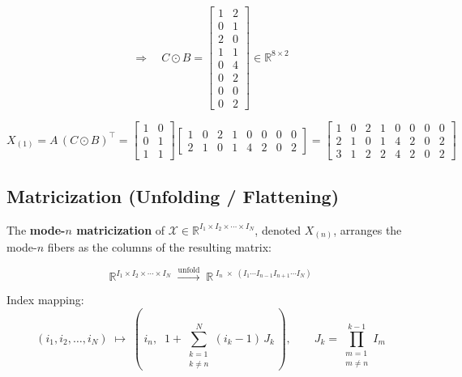 \documentclass[12pt]{article}
\newcommand{\T}[1]{\mathcal{#1}}   %
\begin{document}
\begin{equation}
\Rightarrow \quad
C \odot B =
\begin{bmatrix}
1 & 2 \\
0 & 1 \\
2 & 0 \\
1 & 1 \\
0 & 4 \\
0 & 2 \\
0 & 0 \\
0 & 2
\end{bmatrix}
\in \mathbb{R}^{8 \times 2}
\end{equation}

\begin{equation}
X_{(1)} = A\,(C \odot B)^{\top}
=
\begin{bmatrix}1&0\\0&1\\1&1\end{bmatrix}
\begin{bmatrix}
1&0&2&1&0&0&0&0\\
2&1&0&1&4&2&0&2
\end{bmatrix}
=
\begin{bmatrix}
1&0&2&1&0&0&0&0\\
2&1&0&1&4&2&0&2\\
3&1&2&2&4&2&0&2
\end{bmatrix}
\end{equation}

\subsection{Matricization (Unfolding / Flattening)}

The \textbf{mode-$n$ matricization} of
$\T{X} \in \mathbb{R}^{I_1 \times I_2 \times \cdots \times I_N}$,
denoted $X_{(n)}$, arranges the mode-$n$ fibers as the columns of the resulting matrix:

\begin{equation}
\mathbb{R}^{I_1 \times I_2 \times \cdots \times I_N}
\;\xrightarrow{\text{unfold}}\;
\mathbb{R}^{\;I_n \;\times\; (I_1 \cdots I_{n-1} I_{n+1} \cdots I_N)}
\end{equation}

\noindent Index mapping:
\begin{equation}
(i_1, i_2, \ldots, i_N)
\;\longmapsto\;
\left(\,i_n,\;\; 1 + \sum_{\substack{k=1\\k\neq n}}^{N}(i_k-1)\,J_k\,\right),
\qquad
J_k = \prod_{\substack{m=1\\m\neq n}}^{k-1} I_m
\end{equation}
\end{document}
